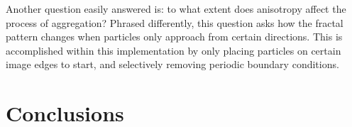 \documentclass[12pt]{article}
\begin{document}

Another question easily answered is: to what extent does anisotropy affect the process of aggregation?  
Phrased differently, this question asks how the fractal pattern changes when particles only approach from certain directions.
This is accomplished within this implementation by only placing particles on certain image edges to start, and selectively removing periodic boundary conditions.


\section*{Conclusions}
\end{document}
